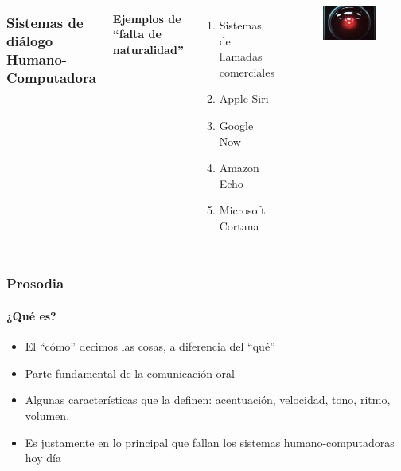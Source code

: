 \begin{frame}
  \begin{columns}
    \frametitle{Sistemas de diálogo Humano-Computadora}
    \framesubtitle{Ejemplos de ``falta de naturalidad''}
    \begin{enumerate}
      \item Sistemas de llamadas comerciales
      \item Apple Siri
      \item Google Now
      \item Amazon Echo
      \item Microsoft Cortana
    \end{enumerate}
    \begin{figure}
      \includegraphics[scale=0.25]{images/hal.jpg}
    \end{figure}
  \end{columns}
\end{frame}


\begin{frame}
  \frametitle{Prosodia}
  \framesubtitle{¿Qué es?}
  \begin{itemize}
    \item El ``cómo'' decimos las cosas, a diferencia del ``qué''
    \item Parte fundamental de la comunicación oral
    \item Algunas características que la definen: acentuación, velocidad, tono, ritmo, volumen.
    \item Es justamente en lo principal que fallan los sistemas humano-computadoras hoy día
  \end{itemize}
\end{frame}



